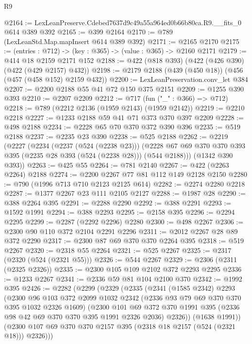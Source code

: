 \begin{lexlean}{R9}
\begin{coremodule}
@2164 := LexLeanPreserve.Cdebed7637d9c49a55a964ed0b66b80ca.R9.__fits_0 @614 @389 @392
@2165 := @399 @2164
@2170 := @789 (LexLeanStd.Map.mapInsert @614 @389 @392)
@2171 := @2165 @2170
@2175 := (entries : @712) -> (key : @365) -> (value : @365) -> @2160 @2171
@2179 := @414 @18 @2159 @2171 @152
@2188 := @422 (@818 @393) (@422 (@426 @390) (@422 (@429 @2157) @432))
@2198 := @2179 @2188 (@439 (@450 @18)) (@456 (@457 (@458 @152) @2159 @432))
@2200 := LexLeanPreservation.conv_let @384
@2207 := @2200 @2188 @55 @41 @72 @150 @375 @2151
@2209 := @1255 @390 @393
@2210 := @2207 @2209
@2212 := @717 (fun ("_" : @366) => @712)
@2218 := @789 (@2212 @2136 (@1959 @2143) (@1959 @2142))
@2219 := @2210 @2218
@2227 := @1233 @2188 @59 @41 @71 @373 @370 @397 @2209
@2228 := @498 @2188
@2234 := @2228 @65 @70 @370 @372 @390 @396
@2235 := @519 @2188
@2237 := @2235 @23 @390
@2238 := @525 @2188
@2262 := @2219
    (@2227
      (@2234
        (@2237 (@524 (@2238 @23)))
        (@2228 @67 @69 @370 @370 @393 @395 (@2235 @28 @393 (@524 (@2238 @28))) (@544 @2188)))
      (@1342 @390 @393))
@2263 := @425 @55
@2264 := @781 @2140
@2267 := @422 (@2263 @2264) @2188
@2274 := @2200 @2267 @77 @81 @112 @149 @2128 @2150
@2280 := @790 (@1996 @713 @710 @2123 @2125 @614)
@2282 := @2274 @2280 @2218
@2287 := @1377 @2267 @23 @111 @2105 @2127
@2288 := @1987 @28
@2290 := @388 @2264 @395
@2291 := @2288 @2290
@2292 := @388 @2291
@2293 := @1592 @1991
@2294 := @388 @2293
@2295 := @2158 @395
@2296 := @2294 @2295
@2299 := @2287 (@2292 @2296) @2280
@2300 := @498 @2267
@2306 := @2300 @90 @110 @372 @2104 @2291 @2296
@2311 := @2012 @2267 @28 @89 @372 @2290
@2317 := @2300 @87 @69 @370 @370 @2264 @395
@2318 := @519 @2267
@2320 := @2318 @55 @2264
@2321 := @525 @2267
@2325 := @2317 (@2320 (@524 (@2321 @55)))
@2326 := @544 @2267
@2329 := @2306 (@2311 (@2325 @2326))
@2335 := @2300 @105 @109 @2102 @372 @2293 @2295
@2336 := @1233 @2267
@2341 := @2336 @59 @81 @104 @2100 @370
@2342 := @1992 @395
@2426 := @2282
    (@2299
      (@2329
        (@2335
          (@2341
            (@1585 @2342)
            @2293
            (@2300
              @96
              @103
              @372
              @2099
              @1032
              @2342
              (@2336 @93 @79 @69 @370 @370 @395 @1032 @2326 @1609)
              (@2300
                @101
                @69
                @372
                @370
                @1991
                @395
                (@2336 @98 @42 @69 @370 @370 @395 @1991 @2326 @2036)
                @2326))
            (@1638 @1991))
          (@2300 @107 @69 @370 @370 @2157 @395 (@2318 @18 @2157 (@524 (@2321 @18))) @2326)))

\end{coremodule}
\end{lexlean}
